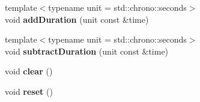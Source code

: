 \begin{DoxyCompactItemize}
\item 
\hypertarget{classstb_1_1Timer_ae73beef5bda968742e0958403738da87}{{\footnotesize template$<$typename unit  = std\+::chrono\+::seconds$>$ }\\void {\bfseries add\+Duration} (unit const \&time)}\label{classstb_1_1Timer_ae73beef5bda968742e0958403738da87}

\item 
\hypertarget{classstb_1_1Timer_a6e3dcff21a6433f257bc59b5b29a3339}{{\footnotesize template$<$typename unit  = std\+::chrono\+::seconds$>$ }\\void {\bfseries subtract\+Duration} (unit const \&time)}\label{classstb_1_1Timer_a6e3dcff21a6433f257bc59b5b29a3339}

\item 
\hypertarget{classstb_1_1Timer_aac66cb13a7217ad9c4c4ec301a229ed0}{void {\bfseries clear} ()}\label{classstb_1_1Timer_aac66cb13a7217ad9c4c4ec301a229ed0}

\item 
\hypertarget{classstb_1_1Timer_aba7273a277185b9e01a7075b432de7e8}{void {\bfseries reset} ()}\label{classstb_1_1Timer_aba7273a277185b9e01a7075b432de7e8}

\end{DoxyCompactItemize}
